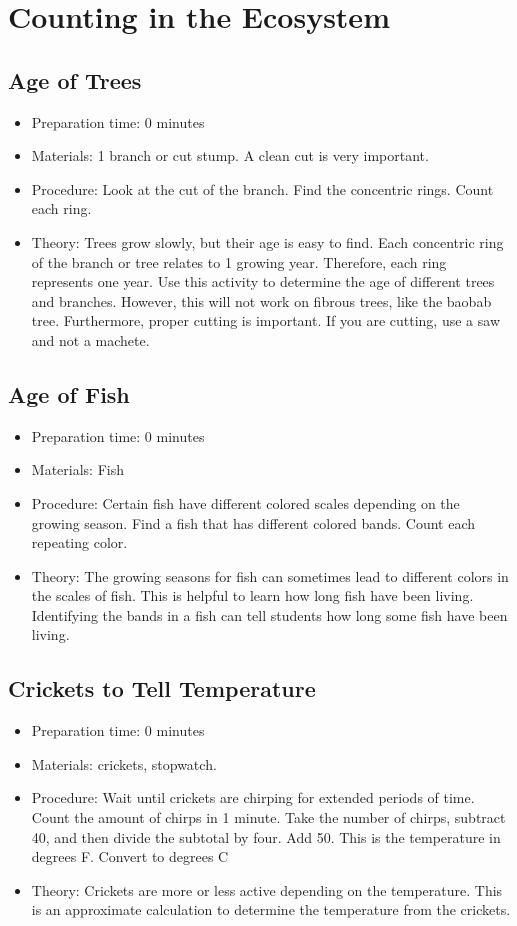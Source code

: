 \section{Counting in the Ecosystem}


\subsection{Age of Trees}
\begin{itemize}
\item{Preparation time: 0 minutes}
\item{Materials: 1 branch or cut stump. A clean cut is very important.}
\item{Procedure: Look at the cut of the branch. Find the concentric rings. Count each ring.}
\item{Theory: Trees grow slowly, but their age is easy to find. Each concentric ring of the branch or tree relates to 1 growing year. Therefore, each ring represents one year. Use this activity to determine the age of different trees and branches. However, this will not work on fibrous trees, like the baobab tree. Furthermore, proper cutting is important. If you are cutting, use a saw and not a machete.}
\end{itemize}

\subsection{Age of Fish}
\begin{itemize}
\item{Preparation time: 0 minutes}
\item{Materials: Fish}
\item{Procedure: Certain fish have different colored scales depending on the growing season. Find a fish that has different colored bands. Count each repeating color. }
\item{Theory: The growing seasons for fish can sometimes lead to different colors in the scales of fish. This is helpful to learn how long fish have been living. Identifying the bands in a fish can tell students how long some fish have been living.}
\end{itemize}

\subsection{Crickets to Tell Temperature}
\begin{itemize}
\item{Preparation time: 0 minutes}
\item{Materials: crickets, stopwatch.}
\item{Procedure: Wait until crickets are chirping for extended periods of time. Count the amount of chirps in 1 minute. Take the number of chirps, subtract 40, and then divide the subtotal by four. Add 50. This is the temperature in degrees F. Convert to degrees C}
\item{Theory:  Crickets are more or less active depending on the temperature. This is an approximate calculation to determine the temperature from the crickets.}
\end{itemize}

